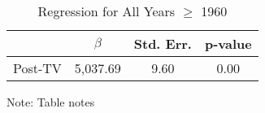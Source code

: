 \noindent 

\begin{table}[H]

\caption{Regression for All Years $\geq$ 1960\label{tab:regression_ge1960}}

\medskip{}



\begin{centering}

\begin{tabular}{cccc}

\hline 

 & $\beta$ & Std. Err. & p-value\tabularnewline

\hline 

Post-TV & 5,037.69 & 9.60 & 0.00\tabularnewline

\hline 

\end{tabular}

\par\end{centering}

\begin{centering}

\medskip{}

\par\end{centering}

{\footnotesize{}Note: Table notes}{\footnotesize\par}

\end{table}